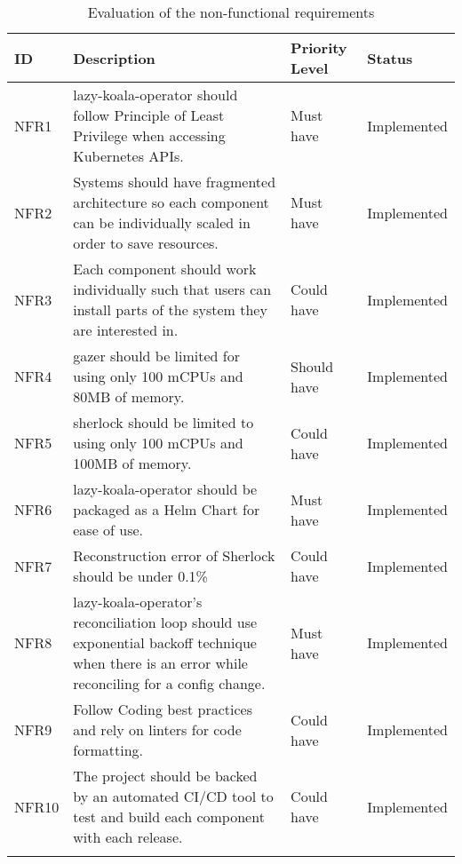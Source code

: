 \begin{longtable}{|p{13mm}|p{80mm}|p{26mm}|p{27mm}|}
    \hline
    \textbf{ID} & \textbf{Description} & \textbf{Priority Level} & \textbf{Status} \\ \hline
    NFR1 & \ac{lazy-koala-operator} should follow Principle of Least Privilege when accessing Kubernetes APIs. & Must have & Implemented \\ \hline
    NFR2 & Systems should have fragmented architecture so each component can be individually scaled in order to save resources. & Must have & Implemented \\ \hline
    NFR3 & Each component should work individually such that users can install parts of the system they are interested in. & Could have & Implemented \\ \hline
    NFR4 & \ac{gazer} should be limited for using only 100 mCPUs and 80MB of memory. & Should have & Implemented \\ \hline
    NFR5 & \ac{sherlock} should be limited to using only 100 mCPUs and 100MB of memory. & Could have & Implemented \\ \hline
    NFR6 & \ac{lazy-koala-operator} should be packaged as a Helm Chart for ease of use. & Must have & Implemented \\ \hline
    NFR7 & Reconstruction error of Sherlock should be under 0.1\% & Could have & Implemented \\ \hline
    NFR8 & \ac{lazy-koala-operator}’s reconciliation loop should use exponential backoff technique when there is an error while reconciling for a config change. & Must have & Implemented \\ \hline
    NFR9 & Follow Coding best practices and rely on linters for code formatting. & Could have & Implemented \\ \hline
    NFR10 & The project should be backed by an automated CI/CD tool to test and build each component with each release. & Could have & Implemented \\ \hline
    \caption{Evaluation of the non-functional requirements}
\end{longtable}